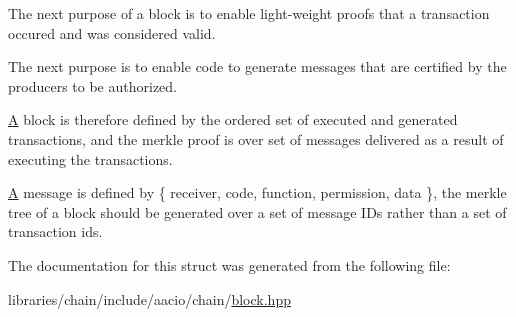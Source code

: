 The next purpose of a block is to enable light-\/weight proofs that a transaction occured and was considered valid.

The next purpose is to enable code to generate messages that are certified by the producers to be authorized.

\mbox{\hyperlink{struct_a}{A}} block is therefore defined by the ordered set of executed and generated transactions, and the merkle proof is over set of messages delivered as a result of executing the transactions.

\mbox{\hyperlink{struct_a}{A}} message is defined by \{ receiver, code, function, permission, data \}, the merkle tree of a block should be generated over a set of message I\+Ds rather than a set of transaction ids. 

The documentation for this struct was generated from the following file\+:\begin{DoxyCompactItemize}
\item 
libraries/chain/include/aacio/chain/\mbox{\hyperlink{block_8hpp}{block.\+hpp}}\end{DoxyCompactItemize}
